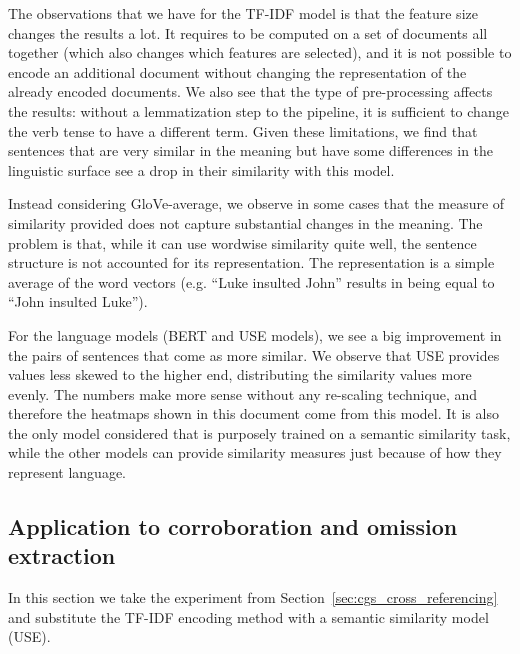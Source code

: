 The observations that we have for the TF-IDF model is that the feature size changes the results a lot.
It requires to be computed on a set of documents all together (which also changes which features are selected), and it is not possible to encode an additional document without changing the representation of the already encoded documents.
We also see that the type of pre-processing affects the results: without a lemmatization step to the pipeline, it is sufficient to change the verb tense to have a different term.
Given these limitations, we find that sentences that are very similar in the meaning but have some differences in the linguistic surface see a drop in their similarity with this model.

Instead considering GloVe-average, we observe in some cases that the measure of similarity provided does not capture substantial changes in the meaning. The problem is that, while it can use wordwise similarity quite well, the sentence structure is not accounted for its representation. The representation is a simple average of the word vectors (e.g. ``Luke insulted John'' results in being equal to ``John insulted Luke'').

For the language models (BERT and USE models), we see a big improvement in the pairs of sentences that come as more similar.
We observe that USE provides values less skewed to the higher end, distributing the similarity values more evenly. The numbers make more sense without any re-scaling technique, and therefore the heatmaps shown in this document come from this model.
It is also the only model considered that is purposely trained on a semantic similarity task, while the other models can provide similarity measures just because of how they represent language.



\subsection{Application to corroboration and omission extraction}
\label{ssec:cgs_similarity_cliques}

In this section we take the experiment from Section~\ref{sec:cgs_cross_referencing} and substitute the TF-IDF encoding method with a semantic similarity model (USE).

